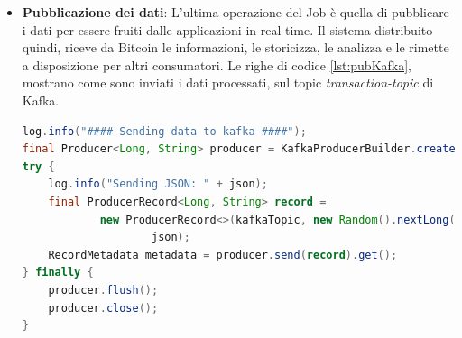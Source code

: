 \begin{itemize}
\begin{itemize}
\begin{lstlisting}[language=Java, label=lst:GraphX, caption={Calcolo PageRank e salvataggio su Neo4j.}]
log.info("### Start PageRank calculation by Graphx ###");

Graph graph = Neo4jGraph.loadGraph(
streamingContext.sparkContext().sc(),
Constants.NODE_LABEL, ScalaUtils.convertListToSeq
(Arrays.asList(Constants.RELATIONS_LABEL)), Constants.NODE_LABEL);

Graph pageRankGraph = PageRank.run(graph,Constants.NUMBER_OF_PAGE_RANK_ITERATIONS,
Constants.RANDOM_RESET_PROBABILITY, 
stringClassTag, stringClassTag);

Neo4jGraph.saveGraph(streamingContext.sparkContext().sc(), pageRankGraph, Constants.NODE_PAGE_RANK_PROP, new Tuple2<String,String>(Constants.RELATIONS_RANK_LABEL, Constants.RELATIONSHIP_PAGE_RANK_PROP) , scala.Option.apply(new Tuple2<String,String>(Constants.NODE_RANK_LABEL, Constants.PAGE_RANK_REFERENCE_ID)), scala.Option.apply(new Tuple2<String,String>(Constants.NODE_RANK_LABEL, Constants.PAGE_RANK_REFERENCE_ID)), true, stringClassTag, stringClassTag);

\end{lstlisting}

Nel codice \ref{lst:GraphX} sono riportare le operazioni che il Job di spark esegue sui nodi esistenti nel sistema. Il primo passo è quello di caricare in una struttura dati tutti i nodi salvati precedentemente. GraphX per questo scopo, mette a disposizione la classe \textit{Graph}.
\\ Caricati i nodi delle transazioni nella struttura dati di Spark viene invocato il metodo \textit{PageRank.run} che esegue il calcolo del PageRank su tutti i nodi del grafo. Questo metodo ritorna un nuovo grafo contenente, per ogni nodo, il valore del PageRank ottenuto.
\\ Terminata l'esecuzione del metodo, non resta che salvare il nuovo grafo ottenuto nella base dati per un impiego futuro.

\item \textbf{Pubblicazione dei dati}: L'ultima operazione del Job è quella di pubblicare i dati per essere fruiti dalle applicazioni in real-time. Il sistema distribuito quindi, riceve da Bitcoin le informazioni, le storicizza, le analizza e le rimette a disposizione per altri consumatori. Le righe di codice  \ref{lst:pubKafka}, mostrano come sono inviati i dati processati, sul topic \textit{transaction-topic} di Kafka. 

\begin{lstlisting}[language=Java, label=lst:pubKafka, caption={Invio dati a Kafka.}]
log.info("#### Sending data to kafka ####");
final Producer<Long, String> producer = KafkaProducerBuilder.createProducer(kafkaHost + ":" + kafkaPort, kafkaAppID );
try {
	log.info("Sending JSON: " + json);
	final ProducerRecord<Long, String> record =
			new ProducerRecord<>(kafkaTopic, new Random().nextLong(),
					json);
	RecordMetadata metadata = producer.send(record).get();
} finally {
	producer.flush();
	producer.close();
}
\end{lstlisting}


\end{itemize}
\end{itemize}
